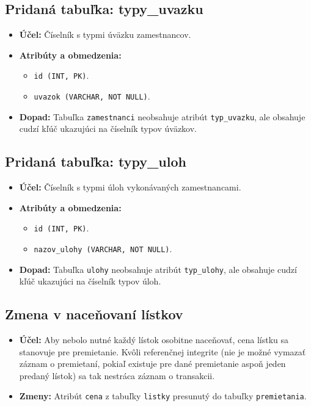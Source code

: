 \documentclass[11pt, a4paper]{article}
\begin{document}
\subsection{Pridaná tabuľka: typy\_uvazku}
\begin{itemize}
    \item \textbf{Účel:} Číselník s typmi úväzku zamestnancov.
    \item \textbf{Atribúty a obmedzenia:}
    \begin{itemize}
        \item \texttt{id (INT, PK)}.
        \item \texttt{uvazok (VARCHAR, NOT NULL)}.
    \end{itemize}
    \item \textbf{Dopad:} Tabuľka \texttt{zamestnanci} neobsahuje atribút \texttt{typ\_uvazku}, ale obsahuje cudzí kľúč ukazujúci na číselník typov úväzkov.
\end{itemize}
\subsection{Pridaná tabuľka: typy\_uloh}
\begin{itemize}
    \item \textbf{Účel:} Číselník s typmi úloh vykonávaných zamestnancami.
    \item \textbf{Atribúty a obmedzenia:}
    \begin{itemize}
        \item \texttt{id (INT, PK)}.
        \item \texttt{nazov\_ulohy (VARCHAR, NOT NULL)}.
    \end{itemize}
    \item \textbf{Dopad:} Tabuľka \texttt{ulohy} neobsahuje atribút \texttt{typ\_ulohy}, ale obsahuje cudzí kľúč ukazujúci na číselník typov úloh.
\end{itemize}
\subsection{Zmena v naceňovaní lístkov}
\begin{itemize}
    \item \textbf{Účel:} Aby nebolo nutné každý lístok osobitne naceňovať, cena lístku sa stanovuje pre premietanie. Kvôli referenčnej integrite (nie je možné vymazať záznam o premietaní, pokiaľ existuje pre dané premietanie aspoň jeden predaný lístok) sa tak nestráca záznam o transakcii.
    \item \textbf{Zmeny:} Atribút \texttt{cena} z tabuľky \texttt{listky} presunutý do tabuľky \texttt{premietania}.
\end{itemize}
\end{document}
